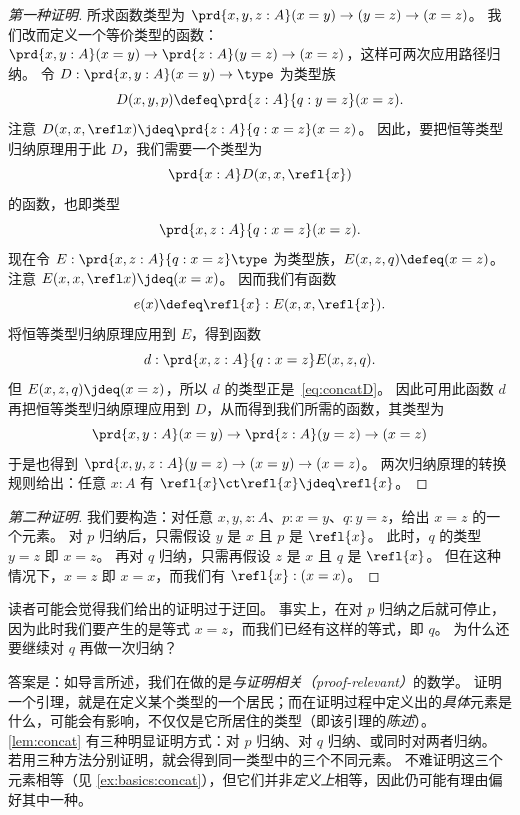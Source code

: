\begin{proof}[第一种证明]
  所求函数类型为 $\prd{x,y,z:A} (x= y) \to   (y= z)\to (x=  z)$。
  我们改而定义一个等价类型的函数：$\prd{x,y:A} (x= y) \to \prd{z:A} (y= z)\to (x=  z)$，这样可两次应用路径归纳。
  令 $D:\prd{x,y:A} (x=y) \to \type$ 为类型族
  \begin{equation*}
    D(x,y,p)\defeq \prd{z:A}{q:y=z} (x=z).
  \end{equation*}
  注意 $D(x,x,\refl x) \jdeq \prd{z:A}{q:x=z} (x=z)$。
  因此，要把恒等类型归纳原理用于此 $D$，我们需要一个类型为
  \begin{equation}\label{eq:concatD}
    \prd{x:A} D(x,x,\refl{x})
  \end{equation}
  的函数，也即类型
  \[ \prd{x,z:A}{q:x=z} (x=z). \]
  现在令 $E:\prd{x,z:A}{q:x=z}\type$ 为类型族，$E(x,z,q)\defeq (x=z)$。
  注意 $E(x,x,\refl x) \jdeq (x=x)$。
  因而我们有函数
  \begin{equation*}
    e(x) \defeq \refl{x} : E(x,x,\refl{x}).
  \end{equation*}
  将恒等类型归纳原理应用到 $E$，得到函数
  \begin{equation*}
    d : \prd{x,z:A}{q:x=z} E(x,z,q).
  \end{equation*}
  但 $E(x,z,q)\jdeq (x=z)$，所以 $d$ 的类型正是~\eqref{eq:concatD}。
  因此可用此函数 $d$ 再把恒等类型归纳原理应用到 $D$，从而得到我们所需的函数，其类型为
  \begin{equation*}
    \prd{x,y:A} (x= y) \to \prd{z:A} (y= z)\to (x=  z)
  \end{equation*}
  于是也得到 $\prd{x,y,z:A} (y=z) \to (x=y) \to (x=z)$。
  两次归纳原理的转换规则给出：任意 $x:A$ 有 $\refl{x}\ct \refl{x}\jdeq \refl{x}$。
\end{proof}

\begin{proof}[第二种证明]
  我们要构造：对任意 $x,y,z:A$、$p:x=y$、$q:y=z$，给出 $x=z$ 的一个元素。
  对 $p$ 归纳后，只需假设 $y$ 是 $x$ 且 $p$ 是 $\refl{x}$。
  此时，$q$ 的类型 $y=z$ 即 $x=z$。
  再对 $q$ 归纳，只需再假设 $z$ 是 $x$ 且 $q$ 是 $\refl{x}$。
  但在这种情况下，$x=z$ 即 $x=x$，而我们有 $\refl{x}:(x=x)$。
\end{proof}

读者可能会觉得我们给出的证明过于迂回。
事实上，在对 $p$ 归纳之后就可停止，因为此时我们要产生的是等式 $x=z$，而我们已经有这样的等式，即 $q$。
为什么还要继续对 $q$ 再做一次归纳？

答案是：如导言所述，我们在做的是\emph{与证明相关（proof-relevant）}的数学。
%
证明一个引理，就是在定义某个类型的一个居民；而在证明过程中定义出的\emph{具体}元素是什么，可能会有影响，不仅仅是它所居住的类型（即该引理的\emph{陈述}）。
\cref{lem:concat} 有三种明显证明方式：对 $p$ 归纳、对 $q$ 归纳、或同时对两者归纳。
若用三种方法分别证明，就会得到同一类型中的三个不同元素。
不难证明这三个元素相等（见 \cref{ex:basics:concat}），但它们并非\emph{定义上}相等，因此仍可能有理由偏好其中一种。


